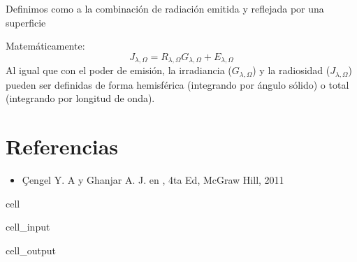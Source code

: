 \documentclass[letterpaper,10pt,english]{jupyterBook}
\let\sphinxpxdimen\pdfpxdimen\else\newdimen\sphinxpxdimen
\begin{document}
\sphinxAtStartPar
Definimos como  a la combinación de radiación emitida y reflejada por una superficie

\noindent{\hspace*{\fill}\sphinxincludegraphics[width=250\sphinxpxdimen]{{radiosity}.png}\hspace*{\fill}}

\sphinxAtStartPar
Matemáticamente:
\label{equation:6_RadiacionTermica/6_RadiacionTermica:0ed26ef9-1321-47a9-91a8-3a658d5dde18}\begin{equation}
J_{\lambda,\Omega} = R_{\lambda,\Omega}G_{\lambda,\Omega}+E_{\lambda,\Omega}
\end{equation}
\sphinxAtStartPar
Al igual que con el poder de emisión, la irradiancia (\(G_{\lambda,\Omega}\)) y la radiosidad (\(J_{\lambda,\Omega}\)) pueden ser definidas de forma hemisférica (integrando por ángulo sólido) o total (integrando por longitud de onda).


\section{Referencias}
\label{\detokenize{6_RadiacionTermica/6_RadiacionTermica:referencias}}\begin{itemize}
\item {} 
\sphinxAtStartPar
Çengel Y. A y Ghanjar A. J.  en , 4ta Ed, McGraw Hill, 2011

\end{itemize}

\begin{sphinxuseclass}{cell}\begin{sphinxVerbatimInput}

\begin{sphinxuseclass}{cell_input}
\begin{sphinxVerbatim}[commandchars=\\\{\}]
   
    
\end{sphinxVerbatim}

\end{sphinxuseclass}\end{sphinxVerbatimInput}
\begin{sphinxVerbatimOutput}

\begin{sphinxuseclass}{cell_output}
\noindent{}

\end{sphinxuseclass}\end{sphinxVerbatimOutput}

\end{sphinxuseclass}






\renewcommand{\indexname}{Index}
\printindex
\end{document}
